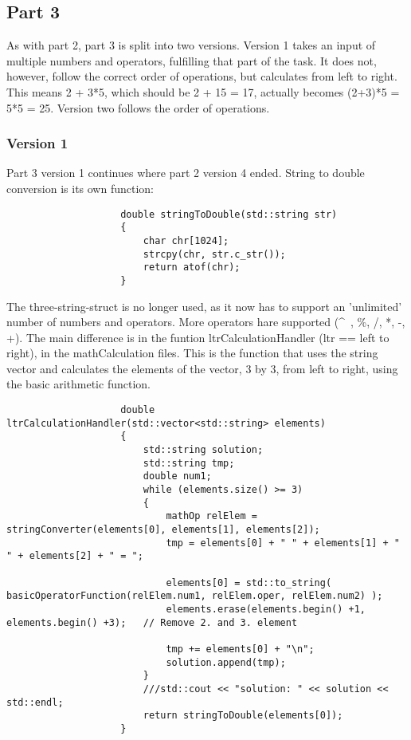 \documentclass{article}
\begin{document}
		
		\subsection{Part 3}
			As with part 2, part 3 is split into two versions. Version 1 takes an input of multiple numbers and operators, fulfilling that part of the task. It does not, however, follow the correct order of operations, but calculates from left to right. This means 2 + 3*5, which should be 2 + 15 = 17, actually becomes (2+3)*5 = 5*5 = 25. Version two follows the order of operations.
			
			\subsubsection{Version 1}
				Part 3 version 1 continues where part 2 version 4 ended. String to double conversion is its own function:
				\begin{lstlisting}
					double stringToDouble(std::string str)
					{
						char chr[1024];
						strcpy(chr, str.c_str());
						return atof(chr);
					}
				\end{lstlisting}
				
				The three-string-struct is no longer used, as it now has to support an 'unlimited' number of numbers and operators.
				More operators hare supported (\^~, \%, /, *, -, +).
				The main difference is in the funtion ltrCalculationHandler (ltr == left to right), in the mathCalculation files. This is the function that uses the string vector and calculates the elements of the vector, 3 by 3, from left to right, using the basic arithmetic function.
				\begin{lstlisting}
					double ltrCalculationHandler(std::vector<std::string> elements)
					{
						std::string solution;
						std::string tmp;
						double num1;
						while (elements.size() >= 3)
						{
							mathOp relElem = stringConverter(elements[0], elements[1], elements[2]);
							tmp = elements[0] + " " + elements[1] + " " + elements[2] + " = ";
							
							elements[0] = std::to_string( basicOperatorFunction(relElem.num1, relElem.oper, relElem.num2) );
							elements.erase(elements.begin() +1, elements.begin() +3);   // Remove 2. and 3. element
							
							tmp += elements[0] + "\n";
							solution.append(tmp);
						}
						///std::cout << "solution: " << solution << std::endl;
						return stringToDouble(elements[0]);
					}
				\end{lstlisting}
				
\end{document}

